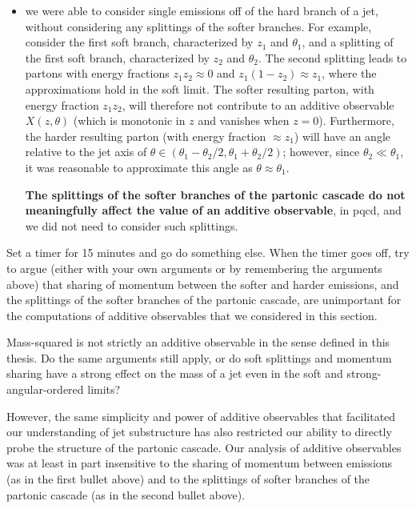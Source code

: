 \begin{itemize}
     \item
         we were able to consider single emissions off of the hard branch of a jet, without considering any splittings of the softer branches.
         For example, consider the first soft branch, characterized by \(z_1\) and \(\theta_1\), and a splitting of the first soft branch, characterized by \(z_2\) and \(\theta_2\).
         The second splitting leads to partons with energy fractions \(z_1 z_2 \approx 0\) and \(z_1 (1-z_2) \approx z_1\), where the approximations hold in the soft limit.
         The softer resulting parton, with energy fraction \(z_1 z_2\), will therefore not contribute to an additive observable \(X(z,\theta)\) (which is monotonic in \(z\) and vanishes when \(z = 0\)).
         Furthermore, the harder resulting parton (with energy fraction \(\approx z_1\)) will have an angle relative to the jet axis of \(\theta \in (\theta_1 - \theta_2/2, \theta_1 + \theta_2/2)\);
         however, since \(\theta_2 \ll \theta_1\), it was reasonable to approximate this angle as \(\theta \approx \theta_1\).

         \textbf{The splittings of the softer branches of the partonic cascade do not meaningfully affect the value of an additive observable}, in \gls{pqcd}, and we did not need to consider such splittings.
\end{itemize}

\begin{exercise}
    Set a timer for 15 minutes and go do something else.
    When the timer goes off, try to argue (either with your own arguments or by remembering the arguments above) that sharing of momentum between the softer and harder emissions, and the splittings of the softer branches of the partonic cascade, are unimportant for the computations of additive observables that we considered in this section.

    Mass-squared is not strictly an additive observable in the sense defined in this thesis.
    Do the same arguments still apply, or do soft splittings and momentum sharing have a strong effect on the mass of a jet even in the soft and strong-angular-ordered limits?
\end{exercise}


However, the same simplicity and power of additive observables that facilitated our understanding of jet substructure has also restricted our ability to directly probe the structure of the partonic cascade.
%
Our analysis of additive observables was at least in part insensitive to the sharing of momentum between emissions (as in the first bullet above) and to the splittings of softer branches of the partonic cascade (as in the second bullet above).


